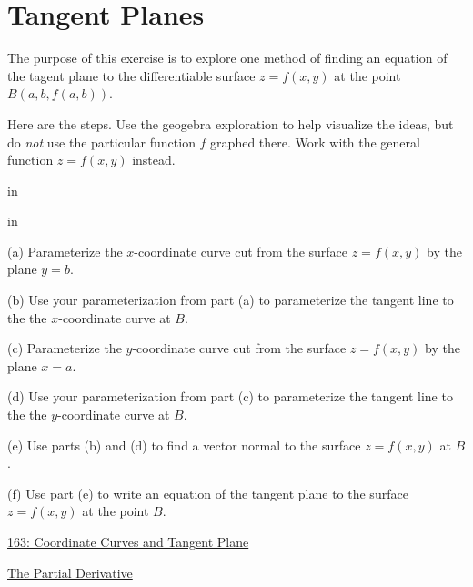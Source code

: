 \documentclass{ximera}
\newcommand{\pskip}{\vskip 0.1 in}
\begin{document}
\section{Tangent Planes}

\begin{exploration} \label{Edgcgtg}
The purpose of this exercise is to explore one method of finding an equation of the tagent plane to the differentiable surface $z=f(x,y)$ at the point $B(a,b,f(a,b))$.

Here are the steps. Use the geogebra exploration to help visualize the ideas, but do \emph{not} use the particular function $f$ graphed there. Work with the general function $z=f(x,y)$ instead.

\pskip

\pskip

(a) Parameterize the $x$-coordinate curve cut from the surface $z=f(x,y)$ by the plane $y=b$.

(b) Use your parameterization from part (a) to parameterize the tangent line to the the $x$-coordinate curve at $B$.

(c) Parameterize the $y$-coordinate curve cut from the surface $z=f(x,y)$ by the plane $x=a$.

(d) Use your parameterization from part (c) to parameterize the tangent line to the the $y$-coordinate curve at $B$.

(e) Use parts (b) and (d) to find a vector normal to the surface $z=f(x,y)$ at $B$.

(f) Use part (e) to write an equation of the tangent plane to the surface $z=f(x,y)$ at the point $B$.


\begin{onlineOnly}
    \begin{center}
\end{center}
\end{onlineOnly}


\href{https://www.geogebra.org/classic/fgdjhdjm}{163: Coordinate Curves and Tangent Plane}




\end{exploration}


\begin{exploration}  \label{Edf754665}

 
\begin{onlineOnly}
    \begin{center}
\end{center}
\end{onlineOnly}


\href{https://www.desmos.com/calculator/y0h5kuvmbt}{The Partial Derivative}

\end{exploration}
\end{document}
